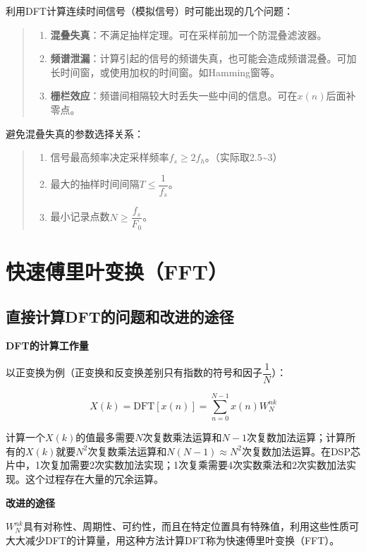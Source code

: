 \documentclass[cn, hazy, blue, normal, 14pt]{elegantnote}
\begin{document}
利用DFT计算连续时间信号（模拟信号）时可能出现的几个问题：

\begin{quote}
\begin{enumerate}
    \item \textbf{混叠失真}：不满足抽样定理。可在采样前加一个防混叠滤波器。
    \item \textbf{频谱泄漏}：计算引起的信号的频谱失真，也可能会造成频谱混叠。可加长时间窗，或使用加权的时间窗。如Hamming窗等。
    \item \textbf{栅栏效应}：频谱间相隔较大时丢失一些中间的信息。可在$x(n)$后面补零点。
\end{enumerate}
\end{quote}

避免混叠失真的参数选择关系：

\begin{quote}
\begin{enumerate}
    \item 信号最高频率决定采样频率$f_s\geq 2f_h$。（实际取2.5\textasciitilde 3）
    \item 最大的抽样时间间隔$T\leq \dfrac{1}{f_s}$。
    \item 最小记录点数$N\geq\dfrac{f_s}{F_0}$。
\end{enumerate}
\end{quote}

\section{快速傅里叶变换（FFT）}

\subsection{直接计算DFT的问题和改进的途径}

\textbf{DFT的计算工作量}

以正变换为例（正变换和反变换差别只有指数的符号和因子$\dfrac{1}{N}$）：

$$X(k)=\text{DFT}[{x}(n)]=\sum_{n=0}^{N-1}{{x}(n)W_{N}^{nk}}$$

计算一个$X(k)$的值最多需要$N$次复数乘法运算和$N-1$次复数加法运算；计算所有的$X(k)$就要$N^2$次复数乘法运算和$N(N-1)\approx N^2$次复数加法运算。在DSP芯片中，1次复加需要2次实数加法实现；1次复乘需要4次实数乘法和2次实数加法实现。这个过程存在大量的冗余运算。

\textbf{改进的途径}

$W_N^{nk}$具有对称性、周期性、可约性，而且在特定位置具有特殊值，利用这些性质可大大减少DFT的计算量，用这种方法计算DFT称为快速傅里叶变换（FFT）。
\end{document}
